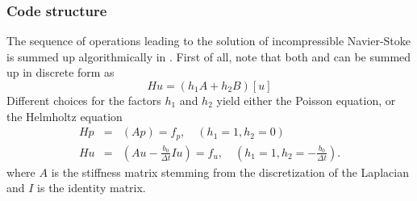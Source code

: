 \documentclass{sig-alternate}
\begin{document}
\subsubsection{Code structure}
\label{sec:code}

The sequence of operations leading to the solution of incompressible
Navier-Stoke is summed up algorithmically in .  
First of all, note that both  and  can be summed up in discrete form as
$$Hu=(h_1 A+h_2 B)[u]$$
Different choices for the factors $h_1$ and $h_2$ yield either the Poisson equation, or the Helmholtz equation
\begin{eqnarray}
Hp &=& (Ap)=f_p, \quad (h_1=1, h_2=0)\\
Hu &=&(Au -\frac{b_0}{\Delta t}I u)=f_u, \quad (h_1=1, h_2=-\frac{b_0}{\Delta t}).
\end{eqnarray}
where $A$ is the stiffness matrix stemming from the discretization of the Laplacian and $I$ is the identity matrix. 
\end{document}
